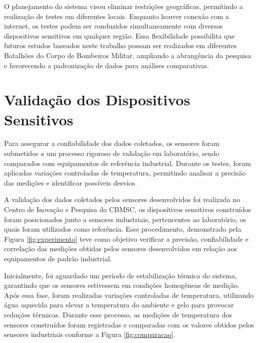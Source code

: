 
\tab O planejamento do sistema visou eliminar restrições geográficas, permitindo a realização de testes em diferentes locais. Enquanto houver conexão com a internet, os testes podem ser conduzidos simultaneamente com diversos dispositivos sensitivos em qualquer região. Essa flexibilidade possibilita que futuros estudos baseados neste trabalho possam ser realizados em diferentes Batalhões do Corpo de Bombeiros Militar, ampliando a abrangência da pesquisa e favorecendo a padronização de dados para análises comparativas.

	
	
\section{Validação dos Dispositivos Sensitivos}
    Para assegurar a confiabilidade dos dados coletados, os sensores foram submetidos a um processo 
	rigoroso de validação em laboratório, sendo comparados com equipamentos de referência industrial. 
	Durante os testes, foram aplicadas variações controladas de temperatura, permitindo analisar a 
	precisão das medições e identificar possíveis desvios.

	A validação dos dados coletados pelos sensores desenvolvidos foi realizada no Centro de Inovação 
	e Pesquisa do \acrshort{CBMSC}, os dispositivos sensitivos
	 construídos foram posicionados junto a sensores industriais, pertencentes ao laboratório, os 
	 quais foram utilizados como referência. Esse procedimento, demonstrado pela Figura 
	 \ref{fig:experimento} teve como objetivo verificar a precisão, confiabilidade e correlação das 
	 medições obtidas pelos sensores desenvolvidos em relação aos equipamentos de padrão industrial.
	
	
	Inicialmente, foi aguardado um período de estabilização térmica do sistema, garantindo que os sensores estivessem em condições homogêneas de medição. Após essa fase, foram realizadas variações controladas de temperatura, utilizando água aquecida para elevar a temperatura do ambiente e gelo para provocar reduções térmicas. Durante esse processo, as medições de temperatura dos sensores construídos foram registradas e comparadas com os valores obtidos pelos sensores industriais conforme a Figura \ref{fig:comparacao}.
	
